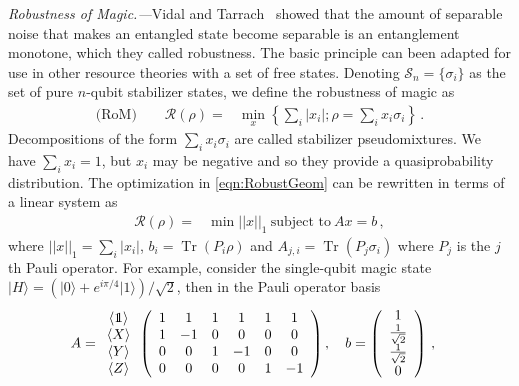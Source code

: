 \documentclass[aps,prl,twocolumn,showpacs,superscriptaddress,groupedaddress,amsmath,amssymb]{revtex4-1}  %
\DeclareMathOperator{\Tr}{Tr}
\def\ket #1{\vert #1\rangle}
\def\id{\mbox{\small 1} \!\! \mbox{1}}
\begin{document}

\noindent\textit{Robustness of Magic.---}Vidal and Tarrach~\cite{vidal_robustness_1999} showed that the amount of separable noise that makes an entangled state become separable is an entanglement monotone, which they called robustness. The basic principle can been adapted for use in other resource theories with a set of free states.  Denoting $\mathcal{S}_n=\{ \sigma_i \}$ as the set of pure $n$-qubit stabilizer states, we define the robustness of magic as
\begin{align}
\text{(RoM)}\qquad \mathcal{R}(\rho)=&\min_{x} \left\{ \sum_i | x_i | ;  \rho = \sum_i x_i \sigma_i \right\} \,. \label{eqn:RobustGeom}
\end{align}
Decompositions of the form $\sum_i x_i \sigma_i$ are called stabilizer pseudomixtures.  We have $\sum_{i}x_i=1$, but $x_i$ may be negative and so they provide a quasiprobability distribution.  The optimization in \eqref{eqn:RobustGeom} can be rewritten in terms of a linear system as 
\begin{align}
\mathcal{R}(\rho)=&\min ||x||_1 \ \text{subject to} \ Ax=b\,, \label{eqn:RobustLP}
\end{align}
where $||x||_1=\sum_i |x_i|$, $b_i=\Tr(P_i\rho)$ and $A_{j,i}=\Tr(P_j\sigma_i)$ where $P_j$ is the $j$th Pauli operator. For example, consider the single-qubit magic state $\ket{H}=(\ket{0}+e^{i\pi/4}\ket{1})/\sqrt{2}$, then in the Pauli operator basis
\begin{align*}
A&=\begin{array}{c}
 \langle \id \rangle \\
 \langle X \rangle \\
 \langle Y \rangle \\
 \langle Z \rangle \\
\end{array}\left(
\begin{array}{cccccc}
 1 & 1 & 1 & 1  & 1 & 1  \\
 1 & -1 & 0 & 0 & 0 & 0  \\
 0 & 0 & 1 & -1 & 0 & 0  \\
 0 & 0 & 0 & 0  & 1 & -1 \\
\end{array}
\right),\quad b=\left(
\begin{array}{c}
1 \\
\frac{1}{\sqrt{2}} \\
\frac{1}{\sqrt{2}} \\
0 \\
\end{array}
\right)\,,
\end{align*}
\end{document}
